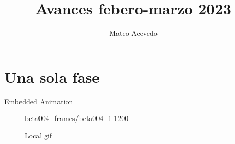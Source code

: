 \documentclass{beamer}
\title{Avances febero-marzo 2023}
\author{Mateo Acevedo}
\date{}
\begin{document}
\maketitle

\section{Una sola fase}

\begin{frame}{Embedded Animation}
\begin{figure}
    \centering
    {beta004_frames/beta004-}%
    {1}%
    {1200}%
    \caption{Local gif}
    \label{fig:my_label}
\end{figure}
\end{frame}
\end{document}
